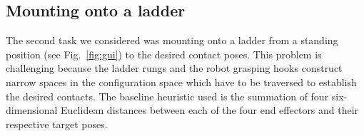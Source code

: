 \documentclass{article}
\begin{document}
\subsection{Mounting onto a ladder}
The second task we considered was mounting onto a ladder from a standing position (see Fig.~\ref{fig:gui}) to the desired contact poses. This problem is challenging because the ladder rungs and the robot grasping hooks construct narrow spaces in the configuration space which have to be traversed to establish the desired contacts. The baseline heuristic  used is the summation of four six-dimensional Euclidean distances between each of the four end effectors and their respective target poses. 





 
\end{document}
